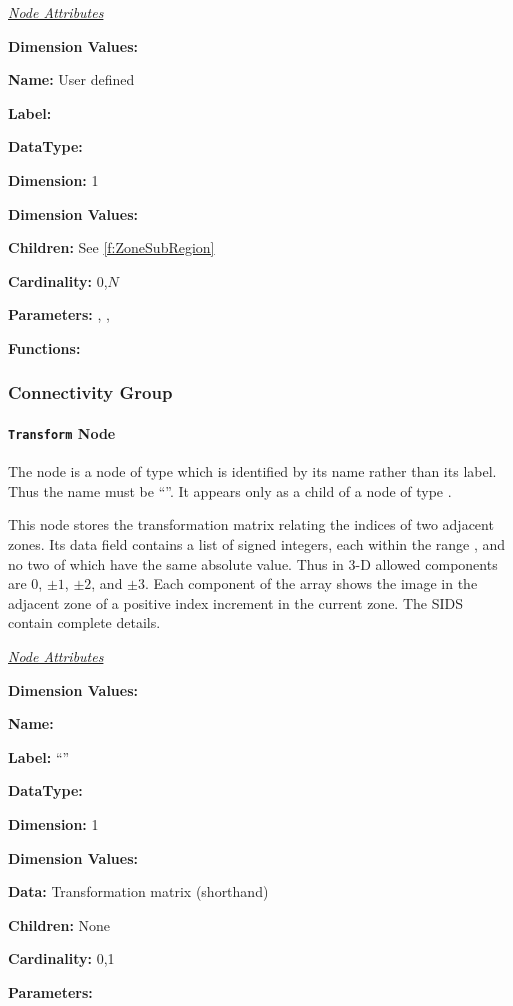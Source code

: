 \textit{\uline{Node Attributes}}
\begin{Ventryic}{\textbf{Dimension Values:}}
\item [\textbf{Name:}]
      User defined
\item [\textbf{Label:}]
\item [\textbf{DataType:}]
\item [\textbf{Dimension:}]
      1
\item [\textbf{Dimension Values:}]
\item [\textbf{Children:}]
      See \autoref{f:ZoneSubRegion}
\item [\textbf{Cardinality:}]
      0,$N$
\item [\textbf{Parameters:}]
      , , 
\item [\textbf{Functions:}]
\end{Ventryic}

\subsubsection{Connectivity Group}

\paragraph{\texttt{Transform} Node}

The  node is a node of type  which is
identified by its name rather than its label. Thus the name must be
``''. It appears only as a child of a node of type
.

This node stores the transformation matrix relating the indices of two
adjacent zones. Its data field contains a list of 
signed integers, each within the range , and no two of which have the same absolute
value. Thus in 3-D allowed components are 0, $\pm 1$, $\pm 2$, and
$\pm 3$. Each component of the array shows the image in the adjacent zone
of a positive index increment in the current zone. The SIDS contain
complete details.

\textit{\uline{Node Attributes}}
\begin{Ventryic}{\textbf{Dimension Values:}}
\item [\textbf{Name:}]
\item [\textbf{Label:}]
      ``''
\item [\textbf{DataType:}]
\item [\textbf{Dimension:}]
      1
\item [\textbf{Dimension Values:}]
\item [\textbf{Data:}]
      Transformation matrix (shorthand)
\item [\textbf{Children:}]
      None
\item [\textbf{Cardinality:}]
      0,1
\item [\textbf{Parameters:}]
\end{Ventryic}

